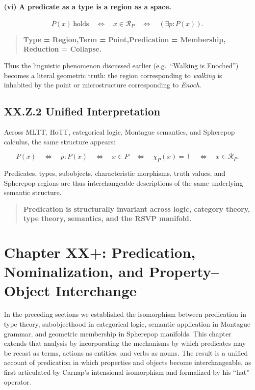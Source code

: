 \documentclass[12pt,letterpaper]{article}
\begin{document}
\paragraph{(vi) A predicate as a type is a region as a space.}
\[
P(x)\ \text{holds} 
\quad\Longleftrightarrow\quad
x \in \mathcal{R}_P
\quad\Longleftrightarrow\quad
(\exists p : P(x)).
\]

\begin{quote}
\textbf{Type = Region,\quad Term = Point,\quad Predication = Membership,\quad
Reduction = Collapse.}
\end{quote}

Thus the linguistic phenomenon discussed earlier (e.g.\ “Walking is Enoched”)
becomes a literal geometric truth: the region corresponding to \emph{walking} is
inhabited by the point or microstructure corresponding to \emph{Enoch}.

\subsection{XX.Z.2 Unified Interpretation}

Across MLTT, HoTT, categorical logic, Montague semantics, and Spherepop
calculus, the same structure appears:

\[
P(x)
\quad\Longleftrightarrow\quad
p : P(x)
\quad\Longleftrightarrow\quad
x \in P
\quad\Longleftrightarrow\quad
\chi_P(x) = \top
\quad\Longleftrightarrow\quad
x \in \mathcal{R}_P.
\]

Predicates, types, subobjects, characteristic morphisms, truth values, and
Spherepop regions are thus interchangeable descriptions of the same underlying
semantic structure.

\begin{quote}
\textbf{Predication is structurally invariant across logic, category theory,
type theory, semantics, and the RSVP manifold.}
\end{quote}

\section{Chapter XX+: Predication, Nominalization, and Property--Object Interchange}

In the preceding sections we established the isomorphism between predication in
type theory, subobjecthood in categorical logic, semantic application in
Montague grammar, and geometric membership in Spherepop manifolds.  This chapter
extends that analysis by incorporating the mechanisms by which predicates may be
recast as terms, actions as entities, and verbs as nouns.  The result is a
unified account of predication in which properties and objects become
interchangeable, as first articulated by Carnap’s intensional isomorphism and
formalized by his ``hat'' operator.
\end{document}
